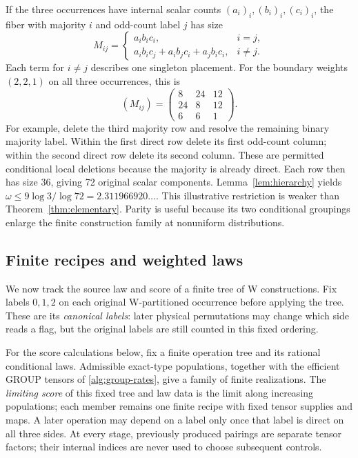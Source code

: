 If the three occurrences have internal scalar counts
\((a_i)_i,(b_i)_i,(c_i)_i\), the fiber with majority \(i\) and odd-count
label \(j\) has size
\begin{equation}
 M_{ij}=
 \begin{cases}
  a_ib_ic_i,&i=j,\\
  a_ib_ic_j+a_ib_jc_i+a_jb_ic_i,&i\ne j.
 \end{cases}
 \label{alg:parity-weights}
\end{equation}
Each term for \(i\ne j\) describes one singleton placement.
For the boundary weights \((2,2,1)\) on all three occurrences, this is
\[
 (M_{ij})=\begin{pmatrix}8&24&12\\24&8&12\\6&6&1\end{pmatrix}.
\]
For example, delete the third majority row and resolve the remaining
binary majority label.  Within the first direct row delete its first
odd-count column; within the second direct row delete its second column.
These are permitted conditional local deletions because the majority is
already direct.  Each row then has size 36, giving 72 original scalar
components.  Lemma~\ref{lem:hierarchy} yields
\(\omega\leq9\log3/\log72=2.311966920\ldots\).
This illustrative restriction is weaker than Theorem~\ref{thm:elementary}.
Parity is useful because its two conditional groupings enlarge the finite
construction family at nonuniform distributions.

\subsection{Finite recipes and weighted laws}
\label{alg:recipes}

We now track the source law and score of a finite tree of W constructions.
Fix labels \(0,1,2\) on each original W-partitioned occurrence before
applying the tree.  These are its \emph{canonical labels}: later physical
permutations may change which side reads a flag, but the original labels
are still counted in this fixed ordering.

For the score calculations below, fix a finite operation tree and its
rational conditional laws.  Admissible exact-type populations, together
with the efficient GROUP tensors of \eqref{alg:group-rates}, give a family
of finite realizations.  The \emph{limiting score} of this fixed tree and
law data is the limit along increasing populations; each member remains
one finite recipe with fixed tensor supplies and maps.
A later operation may depend on a label only once that label is direct on
all three sides.  At every stage, previously produced pairings are separate
tensor factors; their internal indices are never used to choose subsequent
controls.

